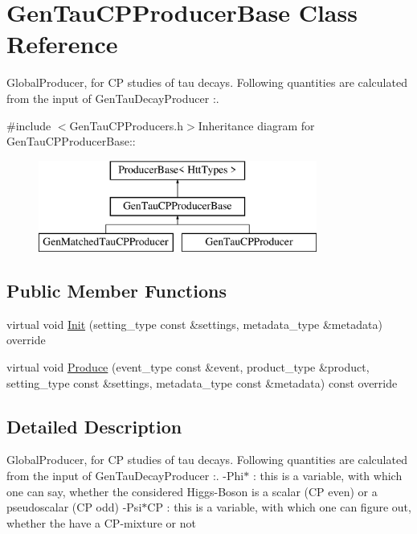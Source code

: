 \hypertarget{classGenTauCPProducerBase}{
\section{GenTauCPProducerBase Class Reference}
\label{classGenTauCPProducerBase}
}


GlobalProducer, for CP studies of tau decays. Following quantities are calculated from the input of GenTauDecayProducer :.  


{\ttfamily \#include $<$GenTauCPProducers.h$>$}Inheritance diagram for GenTauCPProducerBase::\begin{figure}[H]
\begin{center}
\leavevmode
\includegraphics[height=3cm]{classGenTauCPProducerBase}
\end{center}
\end{figure}
\subsection*{Public Member Functions}
\begin{DoxyCompactItemize}
\item 
virtual void \hyperlink{classGenTauCPProducerBase_a5eacebc116568fa618c6171e5e04fd09}{Init} (setting\_\-type const \&settings, metadata\_\-type \&metadata) override
\item 
virtual void \hyperlink{classGenTauCPProducerBase_a99bde6a5233f6794dfac7a744dfa69c5}{Produce} (event\_\-type const \&event, product\_\-type \&product, setting\_\-type const \&settings, metadata\_\-type const \&metadata) const override
\end{DoxyCompactItemize}


\subsection{Detailed Description}
GlobalProducer, for CP studies of tau decays. Following quantities are calculated from the input of GenTauDecayProducer :. -\/Phi$\ast$ : this is a variable, with which one can say, whether the considered Higgs-\/Boson is a scalar (CP even) or a pseudoscalar (CP odd) -\/Psi$\ast$CP : this is a variable, with which one can figure out, whether the have a CP-\/mixture or not 

